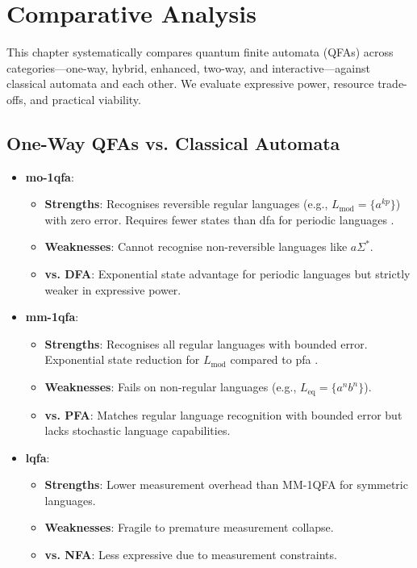 \chapter{Comparative Analysis}
\label{chap:comparative-analysis}

This chapter systematically compares quantum finite automata (QFAs) across categories—one-way, hybrid, enhanced, two-way, and interactive—against classical automata and each other. We evaluate expressive power, resource trade-offs, and practical viability.

\section{One-Way QFAs vs. Classical Automata}
\label{sec:one-way-comparison}
\begin{itemize}
    \item \textbf{\gls{mo-1qfa}}: 
    \begin{itemize}
        \item \textbf{Strengths}: Recognises reversible regular languages (e.g., \( L_{\text{mod}} = \{a^{kp}\} \)) with zero error. Requires fewer states than \gls{dfa} for periodic languages \cite{ambainis2009superiority}.
        \item \textbf{Weaknesses}: Cannot recognise non-reversible languages like \( a\Sigma^* \).
        \item \textbf{vs. DFA}: Exponential state advantage for periodic languages but strictly weaker in expressive power.
    \end{itemize}
    
    \item \textbf{\gls{mm-1qfa}}:
    \begin{itemize}
        \item \textbf{Strengths}: Recognises all regular languages with bounded error. Exponential state reduction for \( L_{\text{mod}} \) compared to \gls{pfa} \cite{kondacs1997power}.
        \item \textbf{Weaknesses}: Fails on non-regular languages (e.g., \( L_{\text{eq}} = \{a^n b^n\} \)).
        \item \textbf{vs. PFA}: Matches regular language recognition with bounded error but lacks stochastic language capabilities.
    \end{itemize}
    
    \item \textbf{\gls{lqfa}}:
    \begin{itemize}
        \item \textbf{Strengths}: Lower measurement overhead than MM-1QFA for symmetric languages.
        \item \textbf{Weaknesses}: Fragile to premature measurement collapse.
        \item \textbf{vs. NFA}: Less expressive due to measurement constraints.
    \end{itemize}
\end{itemize}

